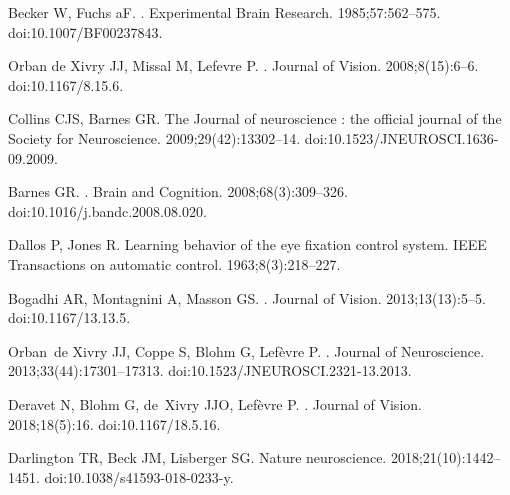 \documentclass[10pt,letterpaper]{article}
\begin{document}
\begin{thebibliography}{10}
Becker W, Fuchs aF.
.
\newblock Experimental Brain Research. 1985;57:562--575.
\newblock doi:{10.1007/BF00237843}.

{Orban de Xivry} JJ, Missal M, Lefevre P.
.
\newblock Journal of Vision. 2008;8(15):6--6.
\newblock doi:{10.1167/8.15.6}.

Collins CJS, Barnes GR.
\newblock The Journal of neuroscience : the official journal of the Society for
  Neuroscience. 2009;29(42):13302--14.
\newblock doi:{10.1523/JNEUROSCI.1636-09.2009}.

Barnes GR.
.
\newblock Brain and Cognition. 2008;68(3):309--326.
\newblock doi:{10.1016/j.bandc.2008.08.020}.

Dallos P, Jones R.
\newblock Learning behavior of the eye fixation control system.
\newblock IEEE Transactions on automatic control. 1963;8(3):218--227.

Bogadhi AR, Montagnini A, Masson GS.
.
\newblock Journal of Vision. 2013;13(13):5--5.
\newblock doi:{10.1167/13.13.5}.

Orban~de Xivry JJ, Coppe S, Blohm G, Lef{\`{e}}vre P.
.
\newblock Journal of Neuroscience. 2013;33(44):17301--17313.
\newblock doi:{10.1523/JNEUROSCI.2321-13.2013}.

Deravet N, Blohm G, de~Xivry JJO, Lef{\`{e}}vre P.
.
\newblock Journal of Vision. 2018;18(5):16.
\newblock doi:{10.1167/18.5.16}.

Darlington TR, Beck JM, Lisberger SG.
\newblock Nature neuroscience. 2018;21(10):1442--1451.
\newblock doi:{10.1038/s41593-018-0233-y}.


\end{thebibliography}
\end{document}

